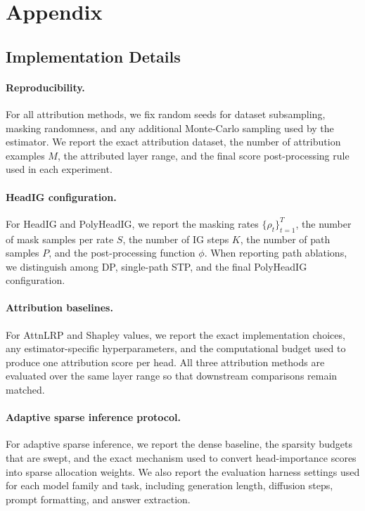 \section{Appendix}
\subsection{Implementation Details}
\label{app:implementation}

\paragraph{Reproducibility.}
For all attribution methods, we fix random seeds for dataset subsampling, masking randomness, and any additional Monte-Carlo sampling used by the estimator. We report the exact attribution dataset, the number of attribution examples $M$, the attributed layer range, and the final score post-processing rule used in each experiment.

\paragraph{HeadIG configuration.}
For HeadIG and PolyHeadIG, we report the masking rates $\{\rho_t\}_{t=1}^{T}$, the number of mask samples per rate $S$, the number of IG steps $K$, the number of path samples $P$, and the post-processing function $\phi$. When reporting path ablations, we distinguish among DP, single-path STP, and the final PolyHeadIG configuration.

\paragraph{Attribution baselines.}
For AttnLRP and Shapley values, we report the exact implementation choices, any estimator-specific hyperparameters, and the computational budget used to produce one attribution score per head. All three attribution methods are evaluated over the same layer range so that downstream comparisons remain matched.

\paragraph{Adaptive sparse inference protocol.}
For adaptive sparse inference, we report the dense baseline, the sparsity budgets that are swept, and the exact mechanism used to convert head-importance scores into sparse allocation weights. We also report the evaluation harness settings used for each model family and task, including generation length, diffusion steps, prompt formatting, and answer extraction.

